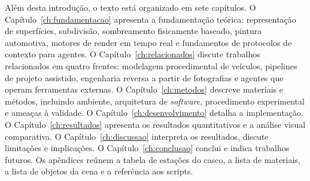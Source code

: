 Al\'em desta introdu\c{c}\~ao, o texto est\'a organizado em sete cap\'itulos. O
Cap\'itulo~\ref{ch:fundamentacao} apresenta a fundamenta\c{c}\~ao te\'orica: representa\c{c}\~ao de
superf\'icies, subdivis\~ao, sombreamento fisicamente baseado, pintura automotiva, motores de
render em tempo real e fundamentos de protocolos de contexto para agentes. O
Cap\'itulo~\ref{ch:relacionados} discute trabalhos relacionados em quatro frentes: modelagem
procedimental de ve\'iculos, pipelines de projeto assistido, engenharia reversa a partir de
fotografias e agentes que operam ferramentas externas. O Cap\'itulo~\ref{ch:metodos} descreve
materiais e m\'etodos, incluindo ambiente, arquitetura de \emph{software}, procedimento
experimental e amea\c{c}as \`a validade. O Cap\'itulo~\ref{ch:desenvolvimento} detalha a
implementa\c{c}\~ao. O Cap\'itulo~\ref{ch:resultados} apresenta os resultados quantitativos e a
an\'alise visual comparativa. O Cap\'itulo~\ref{ch:discussao} interpreta os resultados, discute
limita\c{c}\~oes e implicações. O Cap\'itulo~\ref{ch:conclusao} conclui e indica trabalhos
futuros. Os ap\^endices re\'unem a tabela de esta\c{c}\~oes do casco, a lista de materiais, a
lista de objetos da cena e a refer\^encia aos scripts.
